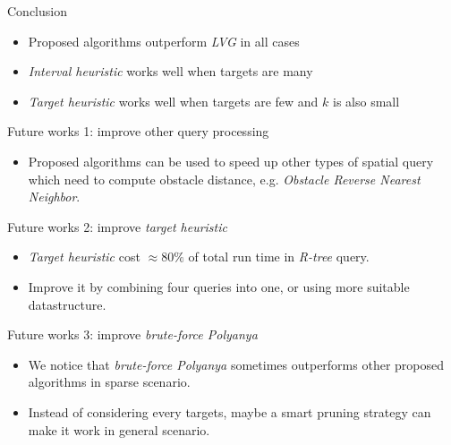 \begin{frame}{Conclusion}
    \begin{itemize}
        \item Proposed algorithms outperform \textit{LVG} in all cases
        \item \textit{Interval heuristic} works well when targets are many
        \item \textit{Target heuristic} works well when targets are few and $k$ is also small
    \end{itemize}
\end{frame}

\begin{frame}{Future works 1: improve other query processing}
    \begin{itemize}
        \item \small{
            Proposed algorithms can be used to speed up other types of spatial query which need to compute obstacle distance, e.g. \textit{Obstacle Reverse Nearest Neighbor}.
        }
    \end{itemize}
\end{frame}

\begin{frame}{Future works 2: improve \textit{target heuristic}}
    \begin{itemize}
        \item \small {
          \textit{Target heuristic} cost $\approx 80\%$ of total run time in \textit{R-tree} query. 
        }
        \item \small {
            Improve it by combining four queries into one, or using more suitable datastructure.
        }
    \end{itemize}
\end{frame}

\begin{frame}{Future works 3: improve \textit{brute-force Polyanya}}
    \begin{itemize}
        \item \small {
            We notice that \textit{brute-force Polyanya} sometimes outperforms other proposed algorithms in sparse scenario.
        }
        \item \small {
            Instead of considering every targets, maybe a smart pruning strategy can make it work in general scenario. 
        }
    \end{itemize}
\end{frame}
